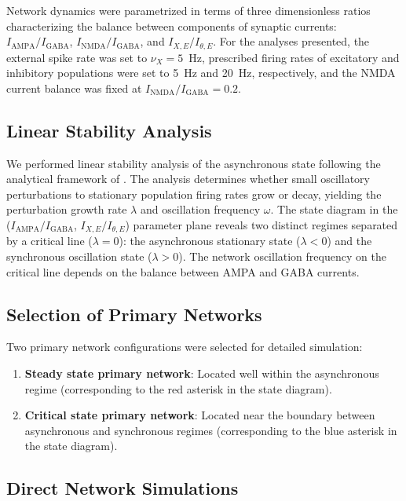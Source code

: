 \documentclass[12pt]{article}
\begin{document}
Network dynamics were parametrized in terms of three dimensionless ratios characterizing the balance between components of synaptic currents: $I_{\text{AMPA}}/I_{\text{GABA}}$, $I_{\text{NMDA}}/I_{\text{GABA}}$, and $I_{X,E}/I_{\theta,E}$. For the analyses presented, the external spike rate was set to $\nu_X = 5$~Hz, prescribed firing rates of excitatory and inhibitory populations were set to 5~Hz and 20~Hz, respectively, and the NMDA current balance was fixed at $I_{\text{NMDA}}/I_{\text{GABA}} = 0.2$.

\subsection{Linear Stability Analysis}

We performed linear stability analysis of the asynchronous state \citep{AbbottVanVreeswijk1993, BrunelHakim1999} following the analytical framework of \citet{BrunelWang2003}. The analysis determines whether small oscillatory perturbations to stationary population firing rates grow or decay, yielding the perturbation growth rate $\lambda$ and oscillation frequency $\omega$. The state diagram in the ($I_{\text{AMPA}}/I_{\text{GABA}}$, $I_{X,E}/I_{\theta,E}$) parameter plane reveals two distinct regimes separated by a critical line ($\lambda = 0$): the asynchronous stationary state ($\lambda < 0$) and the synchronous oscillation state ($\lambda > 0$). The network oscillation frequency on the critical line depends on the balance between AMPA and GABA currents.

\subsection{Selection of Primary Networks}

Two primary network configurations were selected for detailed simulation:

\begin{enumerate}
\item \textbf{Steady state primary network}: Located well within the asynchronous regime (corresponding to the red asterisk in the state diagram).
\item \textbf{Critical state primary network}: Located near the boundary between asynchronous and synchronous regimes (corresponding to the blue asterisk in the state diagram).
\end{enumerate}

\subsection{Direct Network Simulations}
\end{document}
